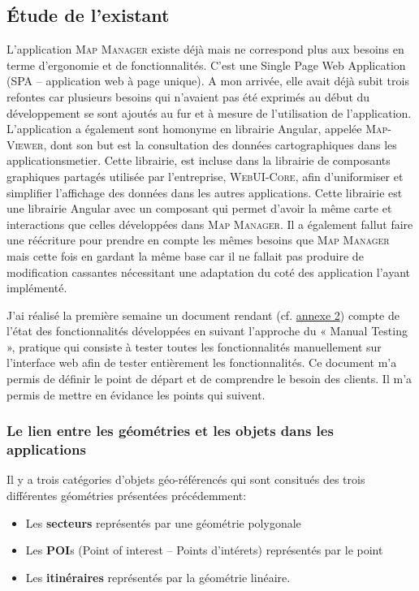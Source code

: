 \documentclass{rapportUHA40}
\begin{document}
\subsection{Étude de l'existant}
L'application \textsc{Map Manager} existe déjà mais ne correspond plus aux
besoins en terme d'ergonomie et de fonctionnalités. C'est une Single Page Web
Application (SPA – application web à page unique). A mon arrivée, elle avait
déjà subit trois refontes car plusieurs besoins qui n'avaient pas été exprimés
au début du développement se sont ajoutés au fur et à mesure de l'utilisation
de l'application. \\

L'application a également sont homonyme en librairie Angular, appelée
\textsc{Map-Viewer}, dont son but est la consultation des données
cartographiques dans les \gls{applicationsmetier}. Cette librairie, est incluse
dans la librairie de composants graphiques partagés utilisée par l'entreprise,
\textsc{WebUI-Core}, afin d'uniformiser et simplifier l'affichage des données
dans les autres applications. Cette librairie est une librairie Angular avec un
composant qui permet d'avoir la même carte et interactions que celles
développées dans \textsc{Map Manager}. Il a également fallut faire une
réécriture pour prendre en compte les mêmes besoins que \textsc{Map Manager}
mais cette fois en gardant la même base car il ne fallait pas produire de
modification cassantes nécessitant une adaptation du coté des application
l'ayant implémenté.

J’ai réalisé la première semaine un document rendant (cf.
\hyperlink{ANNEX2}{annexe 2}) compte de l’état des fonctionnalités développées
en suivant l’approche du « Manual Testing », pratique qui consiste à tester
toutes les fonctionnalités manuellement sur l’interface web afin de tester
entièrement les fonctionnalités. Ce document m’a permis de définir le point de
départ et de comprendre le besoin des clients. Il m'a permis de mettre en
évidance les points qui suivent.

\subsubsection{Le lien entre les géométries et les objets dans les applications}
Il y a trois catégories d'objets géo-référencés qui sont consitués des trois
différentes géométries présentées précédemment:
\begin{itemize}
  \item Les \textbf{secteurs} représentés par une géométrie polygonale
  \item Les \textbf{POI}s (Point of interest – Points d'intérets) représentés par le
        point
  \item Les \textbf{itinéraires} représentés par la géométrie linéaire. \\
\end{itemize}
\end{document}
